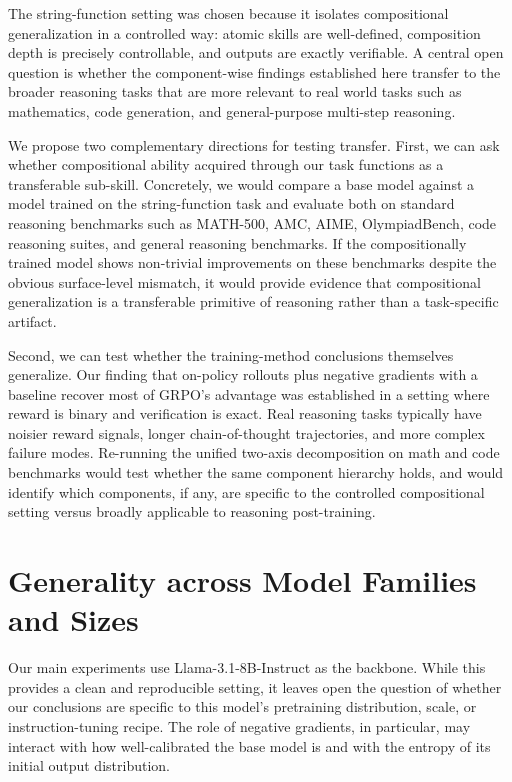 \documentclass[12pt]{cmuthesis}
\begin{document}
The string-function setting was chosen because it isolates compositional generalization in a controlled way: atomic skills are well-defined, composition depth is precisely controllable, and outputs are exactly verifiable. A central open question is whether the component-wise findings established here transfer to the broader reasoning tasks that are more relevant to real world tasks such as mathematics, code generation, and general-purpose multi-step reasoning.

We propose two complementary directions for testing transfer. First, we can ask whether compositional ability acquired through our task functions as a transferable sub-skill. Concretely, we would compare a base model against a model trained on the string-function task and evaluate both on standard reasoning benchmarks such as MATH-500, AMC, AIME, OlympiadBench, code reasoning suites, and general reasoning benchmarks. If the compositionally trained model shows non-trivial improvements on these benchmarks despite the obvious surface-level mismatch, it would provide evidence that compositional generalization is a transferable primitive of reasoning rather than a task-specific artifact.

Second, we can test whether the training-method conclusions themselves generalize. Our finding that on-policy rollouts plus negative gradients with a baseline recover most of GRPO's advantage was established in a setting where reward is binary and verification is exact. Real reasoning tasks typically have noisier reward signals, longer chain-of-thought trajectories, and more complex failure modes. Re-running the unified two-axis decomposition on math and code benchmarks would test whether the same component hierarchy holds, and would identify which components, if any, are specific to the controlled compositional setting versus broadly applicable to reasoning post-training.

\section{Generality across Model Families and Sizes}

Our main experiments use Llama-3.1-8B-Instruct as the backbone. While this provides a clean and reproducible setting, it leaves open the question of whether our conclusions are specific to this model's pretraining distribution, scale, or instruction-tuning recipe. The role of negative gradients, in particular, may interact with how well-calibrated the base model is and with the entropy of its initial output distribution.
\end{document}
